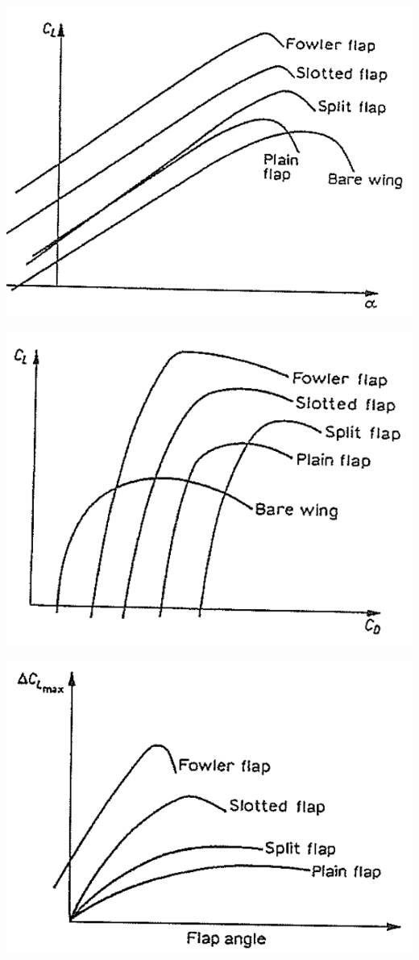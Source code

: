 	\begin{center}
	\begin{minipage}{0.25\textwidth}
	\includegraphics[scale=0.15]{ch5/5}
	\end{minipage}
	\begin{minipage}{0.25\textwidth}
	\includegraphics[scale=0.15]{ch5/6}
	\end{minipage}
	\begin{minipage}{0.3\textwidth}
	\includegraphics[scale=0.2]{ch5/7}

\end{minipage}
\end{center}
